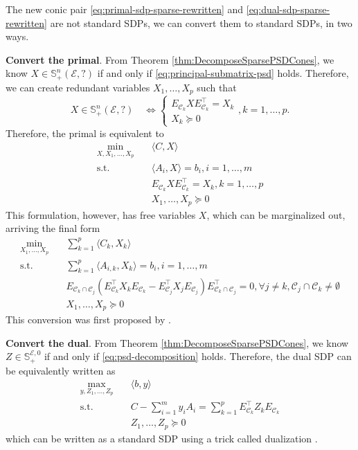 \documentclass[
]{book}
\theoremstyle{definition}
\theoremstyle{definition}
\theoremstyle{definition}
\theoremstyle{definition}
\theoremstyle{remark}
\begin{document}
The new conic pair \eqref{eq:primal-sdp-sparse-rewritten} and \eqref{eq:dual-sdp-sparse-rewritten} are not standard SDPs, we can convert them to standard SDPs, in two ways.

\textbf{Convert the primal}. From Theorem \ref{thm:DecomposeSparsePSDCones}, we know \(X \in \mathbb{S}^{n}_{+}(\mathcal{E},?)\) if and only if \eqref{eq:principal-submatrix-psd} holds. Therefore, we can create redundant variables \(X_1,\dots,X_p\) such that
\[
X \in \mathbb{S}^{n}_{+}(\mathcal{E},?) \quad \Leftrightarrow \begin{cases}
E_{\mathcal{C}_k} X E_{\mathcal{C}_k}^\top= X_k \\
X_k \succeq 0
\end{cases}, k=1,\dots,p.
\]
Therefore, the primal is equivalent to
\begin{equation}
\begin{split}
\min_{X,X_1,\dots,X_p} & \quad \langle C, X \rangle \\
\mathrm{s.t.}& \quad \langle A_i, X \rangle = b_i, i=1,\dots,m \\
& \quad E_{\mathcal{C}_k} X E_{\mathcal{C}_k}^\top= X_k, k=1,\dots,p \\
& \quad X_1,\dots,X_p \succeq 0
\end{split}
\label{eq:primal-sdp-sparse-rewritten-1}
\end{equation}
This formulation, however, has free variables \(X\), which can be marginalized out, arriving the final form
\begin{equation}
\begin{split}
\min_{X_1,\dots,X_p} & \quad \sum_{k=1}^p \langle C_k, X_k \rangle \\
\mathrm{s.t.}& \quad \sum_{k=1}^p \langle A_{i,k}, X_k \rangle = b_i, i=1,\dots,m \\
& \quad E_{\mathcal{C}_k \cap \mathcal{C}_j} \left( E_{\mathcal{C}_k}^\top X_k E_{\mathcal{C}_k} - E_{\mathcal{C}_j}^\top X_j E_{\mathcal{C}_j} \right)E_{\mathcal{C}_k \cap \mathcal{C}_j}^\top= 0, \forall j \neq k, \mathcal{C}_j \cap \mathcal{C}_k \neq \emptyset \\
& \quad X_1,\dots,X_p \succeq 0
\end{split}
\label{eq:primal-sdp-sparse-rewritten-final}
\end{equation}
This conversion was first proposed by \citep{fukuda01siopt-exploiting}.

\textbf{Convert the dual}. From Theorem \ref{thm:DecomposeSparsePSDCones}, we know \(Z \in \mathbb{S}^{\mathcal{E},0}_{+}\) if and only if \eqref{eq:psd-decomposition} holds. Therefore, the dual SDP can be equivalently written as
\begin{equation}
\begin{split}
\max_{y,Z_1,\dots,Z_p} & \quad \langle b, y \rangle \\
\mathrm{s.t.}& \quad C - \sum_{i=1}^m y_i A_i = \sum_{k=1}^p E_{\mathcal{C}_k}^\top Z_k E_{\mathcal{C}_k} \\
& \quad Z_1,\dots,Z_p \succeq 0
\end{split}
\label{eq:dual-sdp-sparse-rewritten-final}
\end{equation}
which can be written as a standard SDP using a trick called dualization \citep{zhang2021sparse}.
\end{document}
